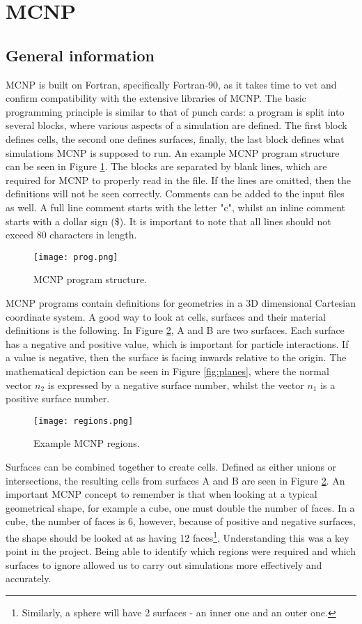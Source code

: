 \section{MCNP}
\label{sec:mcnp}

\subsection{General information}
MCNP is built on Fortran, specifically Fortran-90, as it takes time to vet and confirm compatibility with the extensive libraries of MCNP. The basic programming principle is similar to that of punch cards: a program is split into several blocks, where various aspects of a simulation are defined. The first block defines cells, the second one defines surfaces, finally, the last block defines what simulations MCNP is supposed to run. An example MCNP program structure can be seen in Figure \ref{fig:program}. The blocks are separated by blank lines, which are required for MCNP to properly read in the file. If the lines are omitted, then the definitions will not be seen correctly. Comments can be added to the input files as well. A full line comment starts with the letter "c", whilst an inline comment starts with a dollar sign (\$). It is important to note that all lines should not exceed 80 characters in length.

\begin{figure}[!htbp]
\centering
\texttt{[image: prog.png]}
\caption{MCNP program structure.}
\label{fig:program}
\end{figure}

MCNP programs contain definitions for geometries in a 3D dimensional Cartesian coordinate system. A good way to look at cells, surfaces and their material definitions is the following. In Figure \ref{fig:regions}, A and B are two surfaces. Each surface has a negative and positive value, which is important for particle interactions. If a value is negative, then the surface is facing inwards relative to the origin. The mathematical depiction can be seen in Figure \ref{fig:planes}, where the normal vector $n_2$ is expressed by a negative surface number, whilst the vector $n_1$ is a positive surface number.

\begin{figure}[!htbp]
\centering
\texttt{[image: regions.png]}
\caption{Example MCNP regions.}
\label{fig:regions}
\end{figure}

Surfaces can be combined together to create cells. Defined as either unions or intersections, the resulting cells from surfaces A and B are seen in Figure \ref{fig:regions}. An important MCNP concept to remember is that when looking at a typical geometrical shape, for example a cube, one must double the number of faces. In a cube, the number of faces is 6, however, because of positive and negative surfaces, the shape should be looked at as having 12 faces\footnote{Similarly, a sphere will have 2 surfaces - an inner one and an outer one.}. Understanding this was a key point in the project. Being able to identify which regions were required and which surfaces to ignore allowed us to carry out simulations more effectively and accurately.

